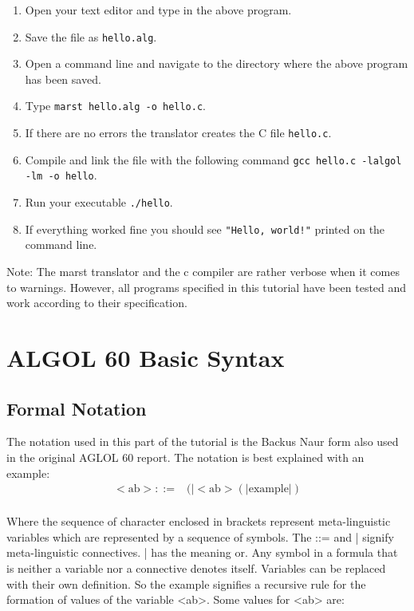 \documentclass{article}
\begin{document}
\begin{enumerate}
	\item Open your text editor and type in the above program.
	\item Save the file as \texttt{hello.alg}.
	\item Open a command line and navigate to the directory where the above program has been saved.
	\item Type \texttt{marst hello.alg -o hello.c}.
	\item If there are no errors the translator creates the C file \texttt{hello.c}.
	\item Compile and link the file with the following command \texttt{gcc hello.c -lalgol -lm -o hello}.
	\item Run your executable \texttt{./hello}.
	\item If everything worked fine you should see \texttt{"Hello, world!"} printed on the command line.
\end{enumerate}

Note: The marst translator and the c compiler are rather verbose when it comes to warnings. However, all programs specified in this tutorial have been tested and work according to their specification.

\newpage

\section{ALGOL 60 Basic Syntax}

\subsection{Formal Notation}
The notation used in this part of the tutorial is the Backus Naur form also used in the original AGLOL 60 report. The notation is best explained with an example:\\

\begin{equation} \label{eq1}
\begin{split}
<\text{ab}> ::=&( |<\text{ab}>(|\text{example}|)  \\
\end{split}
\end{equation}

Where the sequence of character enclosed in brackets represent meta-linguistic variables which are represented by a sequence of symbols. The ::= and | signify meta-linguistic connectives. | has the meaning or. Any symbol in a formula that is neither a variable nor a connective denotes itself. Variables can be replaced with their own definition. So the example signifies a recursive rule for the formation of values of the variable <ab>. Some values for <ab> are:\\
\end{document}
